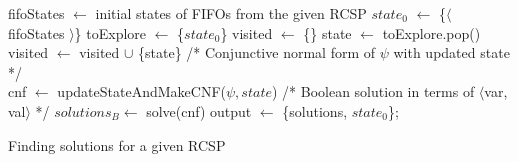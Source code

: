 \begin{algorithm}
\BlankLine
fifoStates $\leftarrow$ initial states of FIFOs from the given RCSP\; 
$state_0$ $\leftarrow$ \{$\langle$ fifoStates $\rangle$\}\;
toExplore $\leftarrow$ \{$state_0$\}\;
visited $\leftarrow$ \{\}\;
{
   state $\leftarrow$ toExplore.pop()\;
   visited $\leftarrow$ visited $\cup$ \{state\}\;
   /* Conjunctive normal form of $\psi$ with updated state */\\
    cnf $\leftarrow$ updateStateAndMakeCNF($\psi, state$) \;
   /* Boolean solution in terms of $\langle$var, val$\rangle$ */\;
   $solutions_B \leftarrow$ solve(cnf)\;
	output $\leftarrow$ \{solutions, $state_0$\};
}
\BlankLine
 \caption{Finding solutions for a given RCSP}
 \label{alg:solvercsp}
\end{algorithm}
\DecMargin{1em}
%
